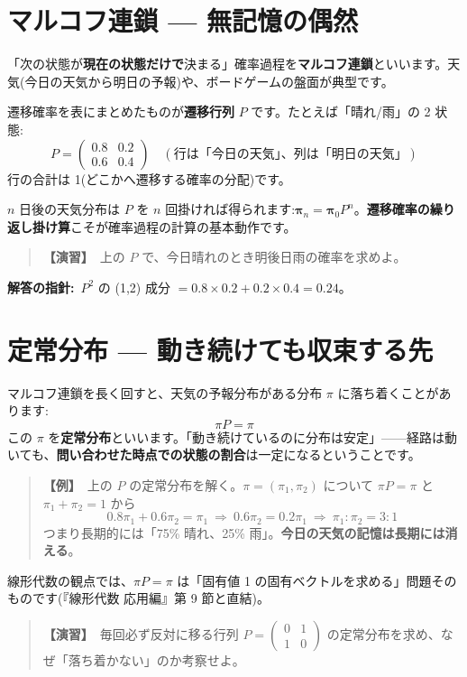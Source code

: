 \documentclass{article}
\begin{document}
\section{マルコフ連鎖 — 無記憶の偶然}

「次の状態が\textbf{現在の状態だけで}決まる」確率過程を\textbf{マルコフ連鎖}といいます。天気(今日の天気から明日の予報)や、ボードゲームの盤面が典型です。

遷移確率を表にまとめたものが\textbf{遷移行列} \(P\) です。たとえば「晴れ/雨」の 2 状態:
\[ P = \begin{pmatrix} 0.8 & 0.2 \\ 0.6 & 0.4 \end{pmatrix} \quad (\text{行は「今日の天気」、列は「明日の天気」}) \]
行の合計は 1(どこかへ遷移する確率の分配)です。

\(n\) 日後の天気分布は \(P\) を \(n\) 回掛ければ得られます:\(\boldsymbol{\pi}_n = \boldsymbol{\pi}_0 P^n\)。\textbf{遷移確率の繰り返し掛け算}こそが確率過程の計算の基本動作です。

\begin{quote}
\textbf{【演習】}\ 上の \(P\) で、今日晴れのとき明後日雨の確率を求めよ。
\end{quote}

\textbf{解答の指針:}\ \(P^2\) の (1,2) 成分 \(= 0.8 \times 0.2 + 0.2 \times 0.4 = 0.24\)。

\section{定常分布 — 動き続けても収束する先}

マルコフ連鎖を長く回すと、天気の予報分布がある分布 \(\pi\) に落ち着くことがあります:
\[ \pi P = \pi \]
この \(\pi\) を\textbf{定常分布}といいます。「動き続けているのに分布は安定」——経路は動いても、\textbf{問い合わせた時点での状態の割合}は一定になるということです。

\begin{quote}
\textbf{【例】}\ 上の \(P\) の定常分布を解く。\(\pi = (\pi_1, \pi_2)\) について \(\pi P = \pi\) と \(\pi_1 + \pi_2 = 1\) から
\[ 0.8\pi_1 + 0.6\pi_2 = \pi_1 \ \Rightarrow\ 0.6\pi_2 = 0.2\pi_1 \ \Rightarrow\ \pi_1 : \pi_2 = 3 : 1 \]
つまり長期的には「75\% 晴れ、25\% 雨」。\textbf{今日の天気の記憶は長期には消える}。
\end{quote}

線形代数の観点では、\(\pi P = \pi\) は「固有値 1 の固有ベクトルを求める」問題そのものです(『線形代数 応用編』第 9 節と直結)。

\begin{quote}
\textbf{【演習】}\ 毎回必ず反対に移る行列 \(P = \begin{pmatrix} 0 & 1 \\ 1 & 0 \end{pmatrix}\) の定常分布を求め、なぜ「落ち着かない」のか考察せよ。
\end{quote}
\end{document}
